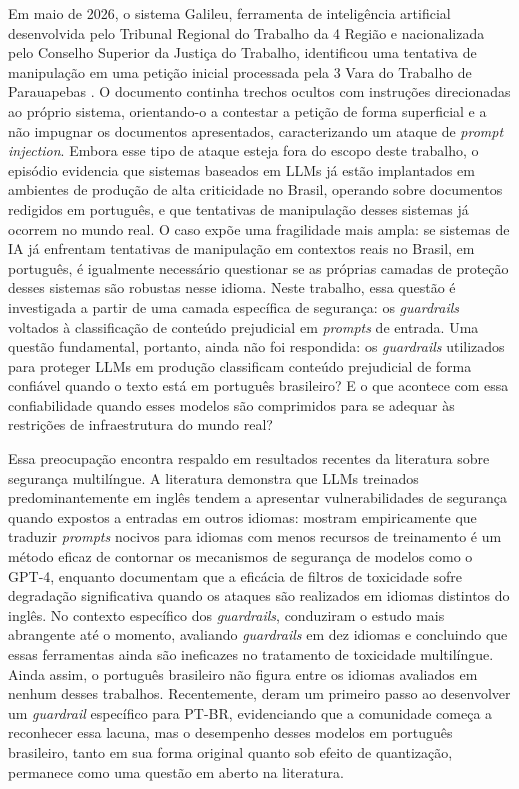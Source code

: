 Em maio de 2026, o sistema Galileu, ferramenta de inteligência artificial desenvolvida pelo Tribunal Regional do Trabalho da 4\textordfeminine{} Região e nacionalizada pelo Conselho Superior da Justiça do Trabalho, identificou uma tentativa de manipulação em uma petição inicial processada pela 3\textordfeminine{} Vara do Trabalho de Parauapebas \cite{trt4galileu2026}. O documento continha trechos ocultos com instruções direcionadas ao próprio sistema, orientando-o a contestar a petição de forma superficial e a não impugnar os documentos apresentados, caracterizando um ataque de \textit{prompt injection}. Embora esse tipo de ataque esteja fora do escopo deste trabalho, o episódio evidencia que sistemas baseados em LLMs já estão implantados em ambientes de produção de alta criticidade no Brasil, operando sobre documentos redigidos em português, e que tentativas de manipulação desses sistemas já ocorrem no mundo real. O caso expõe uma fragilidade mais ampla: se sistemas de IA já enfrentam tentativas de manipulação em contextos reais no Brasil, em português, é igualmente necessário questionar se as próprias camadas de proteção desses sistemas são robustas nesse idioma. Neste trabalho, essa questão é investigada a partir de uma camada específica de segurança: os \textit{guardrails} voltados à classificação de conteúdo prejudicial em \textit{prompts} de entrada. Uma questão fundamental, portanto, ainda não foi respondida: os \textit{guardrails} utilizados para proteger LLMs em produção classificam conteúdo prejudicial de forma confiável quando o texto está em português brasileiro? E o que acontece com essa confiabilidade quando esses modelos são comprimidos para se adequar às restrições de infraestrutura do mundo real?

Essa preocupação encontra respaldo em resultados recentes da literatura sobre segurança multilíngue. A literatura demonstra que LLMs treinados predominantemente em inglês tendem a apresentar vulnerabilidades de segurança quando expostos a entradas em outros idiomas:  mostram empiricamente que traduzir \textit{prompts} nocivos para idiomas com menos recursos de treinamento é um método eficaz de contornar os mecanismos de segurança de modelos como o GPT-4, enquanto  documentam que a eficácia de filtros de toxicidade sofre degradação significativa quando os ataques são realizados em idiomas distintos do inglês. No contexto específico dos \textit{guardrails},  conduziram o estudo mais abrangente até o momento, avaliando \textit{guardrails} em dez idiomas e concluindo que essas ferramentas ainda são ineficazes no tratamento de toxicidade multilíngue. Ainda assim, o português brasileiro não figura entre os idiomas avaliados em nenhum desses trabalhos. Recentemente,  deram um primeiro passo ao desenvolver um \textit{guardrail} específico para PT-BR, evidenciando que a comunidade começa a reconhecer essa lacuna, mas o desempenho desses modelos em português brasileiro, tanto em sua forma original quanto sob efeito de quantização, permanece como uma questão em aberto na literatura.

